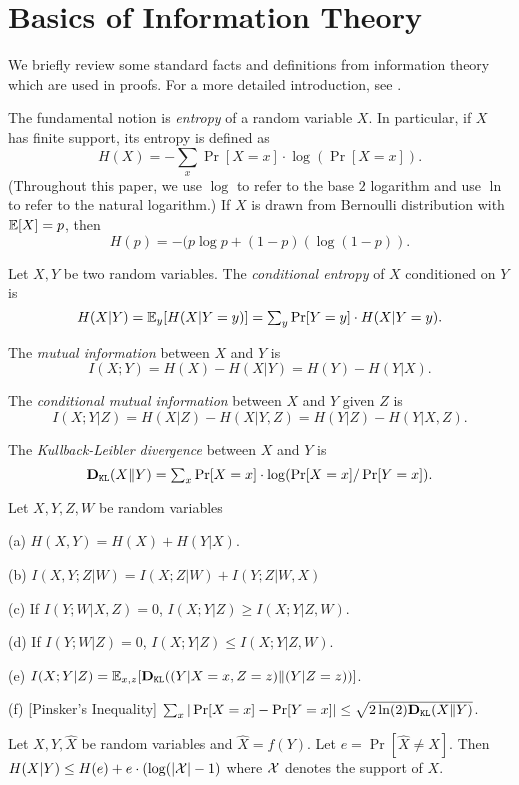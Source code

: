 \section{Basics of Information Theory}


We briefly review some standard facts and definitions from information theory which are used in proofs. For a more detailed introduction, see \cite{CK11}. 

The fundamental notion is \emph{entropy} of a random variable $X$. In particular, if $X$ has finite support, its entropy is defined as 
\[ H(X) = \textstyle - \sum_{x} \Pr[X = x]\cdot  \log(\Pr[X = x]). \]
(Throughout this paper, we use $\log$ to refer to the base $2$ logarithm and use $\ln$ to refer to the natural logarithm.) If $X$ is drawn from Bernoulli distribution with $\mathbb{E}[X]=p$, then 
    \[ H(p) = -(p\log p + (1-p)(\log(1-p)). \]

Let $X,Y$ be two random variables. The \emph{conditional entropy} of $X$ conditioned on $Y$ is 
\[ H(X|Y) 
    = \mathbb{E}_y[H(X|Y = y)] 
    = \textstyle \sum_{y} \Pr[Y=y]\cdot H(X|Y = y). \]

The \emph{mutual information} between $X$ and $Y$ is 
\[ I(X;Y) = H(X) - H(X|Y) = H(Y) - H(Y|X).\]

The \emph{conditional mutual information} between $X$ and $Y$ given $Z$ is  
\[ I(X;Y|Z) = H(X|Z) - H(X|Y,Z) = H(Y|Z) - H(Y|X,Z).\]


The \emph{Kullback-Leibler divergence} between $X$ and $Y$ is 
\[ \textbf{D}_{\mathtt{KL}}(X\| Y)\textstyle  = \sum_x \Pr[X = x] \cdot \log(\Pr[X = x] / \Pr[Y = x]).\]


\begin{lemma}
Let $X,Y,Z,W$ be random variables 
\begin{OneLiners}
\item[(a)] $H(X,Y) = H(X) + H(Y|X)$.
\item[(b)] $I(X,Y;Z|W) = I(X;Z|W) + I(Y;Z|W,X)$
\item[(c)] If $I(Y;W|X,Z) = 0$, $I(X;Y|Z) \geq I(X;Y|Z,W)$.
\item[(d)] If $I(Y;W|Z) = 0$, $I(X;Y|Z) \leq I(X;Y|Z,W)$.
\item[(e)] $I(X;Y|Z) = \mathbb{E}_{x,z}[\textbf{D}_{\mathtt{KL}}((Y|X = x, Z=z)\|(Y|Z=z))]$.
\item[(f)] [Pinsker's Inequality] $\sum_x | \Pr[X=x] - \Pr[Y=x]| \leq \sqrt{2 \ln(2) \textbf{D}_{\mathtt{KL}}(X\|Y)}$.
\end{OneLiners}
\end{lemma}

\begin{lemma}
Let $X,Y,\hat{X}$ be random variables and $\hat{X} = f(Y)$. Let $e = \Pr[\hat{X} \neq X]$. Then $H(X|Y) \leq H(e) + e \cdot (\log(|\mathcal{X}|-1)$ where $\mathcal{X}$ denotes the support of $X$.
\end{lemma} 